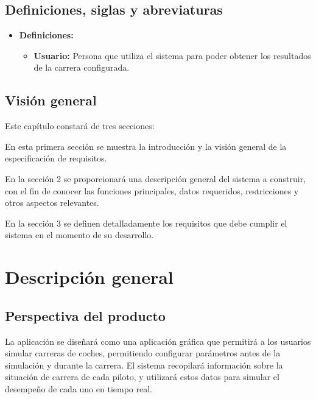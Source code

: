 \subsection{Definiciones, siglas y abreviaturas}

\begin{itemize}
    \item \textbf{Definiciones: }
        \begin{itemize}
            \item \textbf{Usuario: }Persona que utiliza el sistema para poder obtener los resultados de la carrera configurada.
        \end{itemize}
\end{itemize}


\subsection{Visión general}
Este capítulo constará de tres secciones: %

\bigskip

En esta primera sección se muestra la introducción y la visión general de la especificación de requisitos.

\bigskip

En la sección 2 se proporcionará una descripción general del sistema a construir, con el fin de conocer las funciones principales, datos requeridos, restricciones y otros aspectos relevantes. 

\bigskip

En la sección 3 se definen detalladamente los requisitos que debe cumplir el sistema en el momento de su desarrollo.

\section{Descripción general}
\subsection{Perspectiva del producto}
La aplicación se diseñará como una aplicación gráfica que permitirá a los usuarios simular carreras de coches, permitiendo configurar parámetros antes de la simulación y durante la carrera. El sistema recopilará información sobre la situación de carrera de cada piloto, y utilizará estos datos para simular el desempeño de cada uno en tiempo real.

